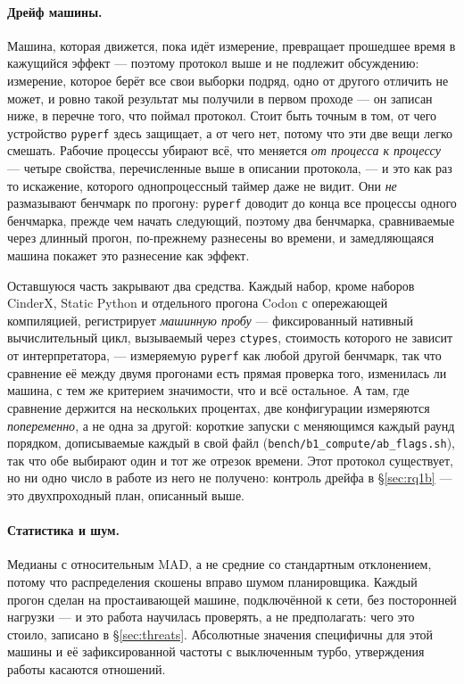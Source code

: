 \documentclass[10pt,a4paper]{article}
\newcommand{\code}[1]{\texttt{\small #1}}
\begin{document}
\paragraph{Дрейф машины.}
Машина, которая движется, пока идёт измерение, превращает прошедшее время в кажущийся эффект ---
поэтому протокол выше и не подлежит обсуждению: измерение, которое берёт все свои выборки подряд,
одно от другого отличить не может, и ровно такой результат мы получили в первом проходе --- он
записан ниже, в перечне того, что поймал протокол. Стоит быть точным в том, от чего устройство \code{pyperf} здесь
защищает, а от чего нет, потому что эти две вещи легко смешать. Рабочие процессы убирают
всё, что меняется \emph{от процесса к процессу} --- четыре свойства, перечисленные выше в описании
протокола, --- и это как раз то искажение, которого однопроцессный таймер даже не видит. Они \emph{не} размазывают бенчмарк по прогону: \code{pyperf} доводит до конца
все процессы одного бенчмарка, прежде чем начать следующий, поэтому два бенчмарка,
сравниваемые через длинный прогон, по-прежнему разнесены во времени, и замедляющаяся машина
покажет это разнесение как эффект.

Оставшуюся часть закрывают два средства. Каждый набор, кроме наборов CinderX, Static Python
и отдельного прогона Codon с опережающей компиляцией, регистрирует \emph{машинную пробу} ---
фиксированный нативный вычислительный цикл, вызываемый через \code{ctypes}, стоимость которого не
зависит от интерпретатора, --- измеряемую \code{pyperf} как любой другой бенчмарк, так что
сравнение её между двумя прогонами есть прямая проверка того, изменилась ли машина, с тем же
критерием значимости, что и всё остальное. А там, где сравнение держится на нескольких процентах,
две конфигурации измеряются \emph{попеременно}, а не одна за другой: короткие запуски с меняющимся
каждый раунд порядком, дописываемые каждый в свой файл (\code{bench/b1\_compute/ab\_flags.sh}), так
что обе выбирают один и тот же отрезок времени. Этот протокол существует, но ни одно число в работе из него не
получено: контроль дрейфа в \S\ref{sec:rq1b} --- это двухпроходный план, описанный выше.

\paragraph{Статистика и шум.}
Медианы с относительным MAD, а не средние со стандартным отклонением, потому что распределения
скошены вправо шумом планировщика. Каждый прогон сделан на простаивающей машине, подключённой к
сети, без посторонней нагрузки --- и это работа научилась проверять, а не предполагать:
чего это стоило, записано в \S\ref{sec:threats}. Абсолютные значения специфичны для этой машины и её
зафиксированной частоты с выключенным турбо, утверждения работы касаются отношений.
\end{document}

